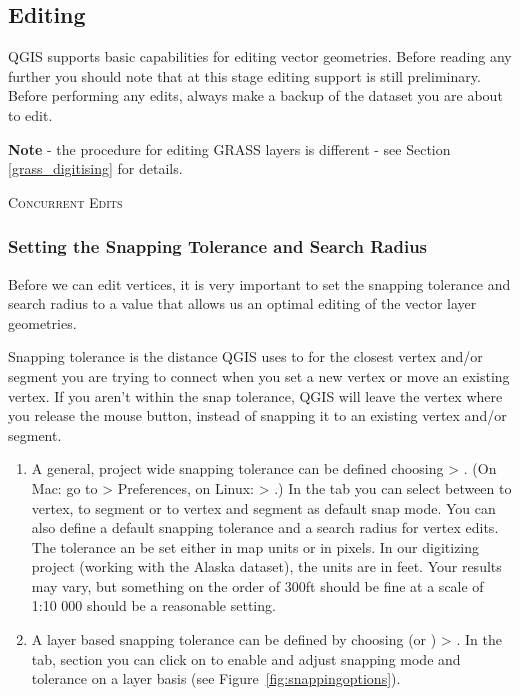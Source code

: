 \subsection{Editing}

QGIS supports basic capabilities for editing vector geometries.  Before reading any
further you should note that at this stage editing support is still preliminary.
Before performing any edits, always make a backup of the dataset you are about
to edit. 

\textbf{Note} - the procedure for editing GRASS layers is different - see
Section \ref{grass_digitising} for details.

\begin{Tip}[ht]\caption{\textsc{Concurrent Edits}}
\end{Tip}

\subsubsection{Setting the Snapping Tolerance and Search Radius}

Before we can edit vertices, it is very important to set the snapping
tolerance and search radius to a value that allows us an optimal editing of
the vector layer geometries. 


Snapping tolerance is the distance QGIS uses to  for the
closest vertex and/or segment you are trying to
connect when you set a new vertex or move an existing vertex. If you aren't
within the snap tolerance, QGIS will leave the vertex where you release the
mouse button, instead of snapping it to an existing vertex and/or segment. 

\begin{enumerate}
\item A general, project wide snapping tolerance can be defined choosing
 > . 
(On Mac: go to   > Preferences, on Linux:  > .)
In the  tab you can select between to vertex, to segment or
to vertex and segment as default snap mode. You can also define a default
snapping tolerance and a search radius for vertex edits. The tolerance an be set either in map units or in pixels. 
In our digitizing project (working with the
Alaska dataset), the units are in feet. Your results may vary, but something
on the order of 300ft should be fine at a scale of 1:10 000 should be a
reasonable setting.
\item A layer based snapping tolerance can be defined by choosing
 (or ) > . In the  tab, section  you
can click on  to enable and adjust snapping
mode and tolerance on a layer basis (see Figure~\ref{fig:snappingoptions}).
\end{enumerate}

